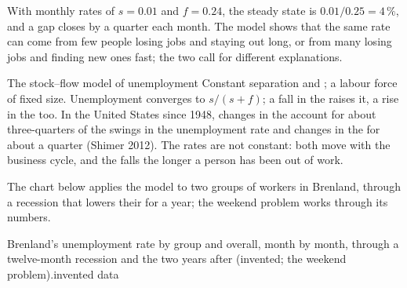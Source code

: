 With monthly rates of $s = 0.01$ and $f = 0.24$, the steady state is $0.01/0.25 = 4\,\%$, and a gap closes by a quarter each month. The model shows that the same rate can
come from few people losing jobs and staying out long, or from many losing jobs and finding new ones fast; the two call for different explanations.

\begin{model}{The stock--flow model of unemployment}
\assumes Constant separation and ; a labour force of fixed size.
\predicts Unemployment converges to $s/(s + f)$; a fall in the  raises it, a rise in the  too.
\tested In the United States since 1948, changes in the  account for about three-quarters of the swings in the unemployment rate and changes in the
   for about a quarter (Shimer 2012).
\breaks The rates are not constant: both move with the business cycle, and the  falls the longer a person has been out of work.
\end{model}

The chart below applies the model to two groups of workers in Brenland, through a recession that lowers their  for a year; the weekend problem works
through its numbers.

\begin{omchart}{Brenland's unemployment rate by group and overall, month by month, through a twelve-month recession and the two years after (invented; the weekend
problem).}{invented data}
\end{omchart}

